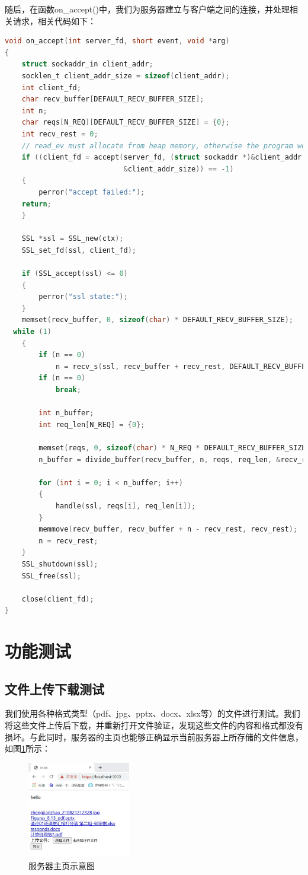 \documentclass[a4paper]{article}
\begin{document}
随后，在函数on\_accept()中，我们为服务器建立与客户端之间的连接，并处理相关请求，相关代码如下：
\begin{lstlisting}[language=C, title=server.c]
  void on_accept(int server_fd, short event, void *arg) 
{
	struct sockaddr_in client_addr;
	socklen_t client_addr_size = sizeof(client_addr);
	int client_fd;
	char recv_buffer[DEFAULT_RECV_BUFFER_SIZE];
	int n;
	char reqs[N_REQ][DEFAULT_RECV_BUFFER_SIZE] = {0};
	int recv_rest = 0;
	// read_ev must allocate from heap memory, otherwise the program would crash from segmant fault
	if ((client_fd = accept(server_fd, (struct sockaddr *)&client_addr,
							&client_addr_size)) == -1)
	{
		perror("accept failed:");
    return;
	}

	SSL *ssl = SSL_new(ctx);
	SSL_set_fd(ssl, client_fd);

	if (SSL_accept(ssl) <= 0)
	{
		perror("ssl state:");
	}
	memset(recv_buffer, 0, sizeof(char) * DEFAULT_RECV_BUFFER_SIZE);
  while (1)
	{
		if (n == 0)
			n = recv_s(ssl, recv_buffer + recv_rest, DEFAULT_RECV_BUFFER_SIZE - recv_rest, 0);
		if (n == 0)
			break;

		int n_buffer;
		int req_len[N_REQ] = {0};

		memset(reqs, 0, sizeof(char) * N_REQ * DEFAULT_RECV_BUFFER_SIZE);
		n_buffer = divide_buffer(recv_buffer, n, reqs, req_len, &recv_rest);

		for (int i = 0; i < n_buffer; i++)
		{
			handle(ssl, reqs[i], req_len[i]);
		}
		memmove(recv_buffer, recv_buffer + n - recv_rest, recv_rest);
		n = recv_rest;
	}
	SSL_shutdown(ssl);
	SSL_free(ssl);

	close(client_fd);
}

\end{lstlisting}

\section{功能测试}
\subsection{文件上传下载测试}
我们使用各种格式类型（pdf、jpg、pptx、docx、xlsx等）的文件进行测试。我们将这些文件上传后下载，并重新打开文件验证，发现这些文件的内容和格式都没有损坏。与此同时，服务器的主页也能够正确显示当前服务器上所存储的文件信息，如图\ref{fig:homepage}所示：
\begin{figure}[!h]
  \centering
  \includegraphics[width=0.4\textwidth]{figs/homepage.jpg}
  \caption{服务器主页示意图}
  \label{fig:homepage}
\end{figure}
\end{document}
